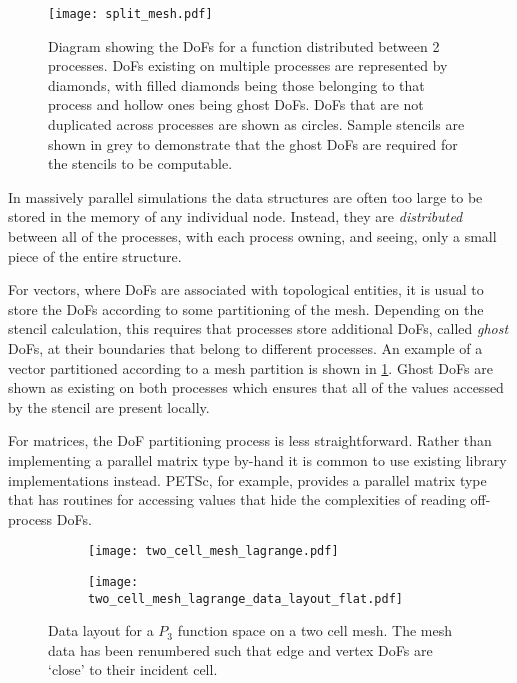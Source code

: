\documentclass[thesis]{subfiles}
\begin{document}
\begin{figure}
  \centering
  \texttt{[image: split\_mesh.pdf]}
  \caption{
    Diagram showing the DoFs for a function distributed between 2 processes.
    DoFs existing on multiple processes are represented by diamonds, with filled diamonds being those belonging to that process and hollow ones being ghost DoFs.
    DoFs that are not duplicated across processes are shown as circles.
    Sample stencils are shown in grey to demonstrate that the ghost DoFs are required for the stencils to be computable.
  }
  \label{fig:pyop2_split_mesh}
\end{figure}

In massively parallel simulations the data structures are often too large to be stored in the memory of any individual node.
Instead, they are \emph{distributed} between all of the processes, with each process owning, and seeing, only a small piece of the entire structure.

For vectors, where DoFs are associated with topological entities, it is usual to store the DoFs according to some partitioning of the mesh.
Depending on the stencil calculation, this requires that processes store additional DoFs, called \emph{ghost} DoFs, at their boundaries that belong to different processes.
An example of a vector partitioned according to a mesh partition is shown in \cref{fig:pyop2_split_mesh}.
Ghost DoFs are shown as existing on both processes which ensures that all of the values accessed by the stencil are present locally.

For matrices, the DoF partitioning process is less straightforward.
Rather than implementing a parallel matrix type by-hand it is common to use existing library implementations instead.
PETSc, for example, provides a parallel matrix type that has routines for accessing values that hide the complexities of reading off-process DoFs.

\begin{figure}
  \centering
  \begin{subfigure}{\textwidth}
    \centering
    \texttt{[image: two\_cell\_mesh\_lagrange.pdf]}
    \vspace{1em}
  \end{subfigure}
  \begin{subfigure}{\textwidth}
    \centering
    \texttt{[image: two\_cell\_mesh\_lagrange\_data\_layout\_flat.pdf]}
  \end{subfigure}
  \caption{
    Data layout for a $P_3$ function space on a two cell mesh.
    The mesh data has been renumbered such that edge and vertex DoFs are `close' to their incident cell.
  }
  \label{fig:mesh_renumbering_demo}
\end{figure}
\end{document}
